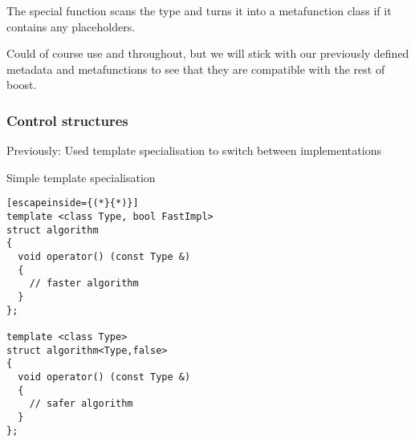 \documentclass[11pt,a4paper,dvipsnames,usenames]{beamer}
\begin{document}
\begin{frame}[fragile]
{    \vspace{1em}

    The special  function scans the  type and turns it into a metafunction class
    if it contains any placeholders.
    
    \vspace{1em}

    Could of course use  and  throughout, but we will stick with
    our previously defined metadata and metafunctions to see that they are compatible with the rest of boost.
  }

  \vfill

\end{frame}

\begin{frame}[fragile]
  \frametitle{Control structures}

  Previously: Used template specialisation to switch between implementations

  \begin{exampleblock}{Simple template specialisation}
    \begin{lstlisting}[escapeinside={(*}{*)}]
template <class Type, bool FastImpl>
struct algorithm
{
  void operator() (const Type &)
  {
    // faster algorithm
  }
};

template <class Type>
struct algorithm<Type,false>
{
  void operator() (const Type &)
  {
    // safer algorithm
  }
};
    \end{lstlisting}
  \end{exampleblock}


\end{frame}
\end{document}
